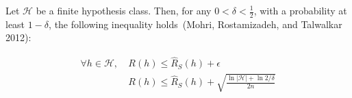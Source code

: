 \documentclass[
  letterpaper,
  12pt,
  british]{tufte-book}
\theoremstyle{plain}
\theoremstyle{definition}
\theoremstyle{plain}
\theoremstyle{remark}
\begin{document}
\protect\hypertarget{thrm:finite-inconsistent}{}{} Let \(\mathcal{H}\)
be a finite hypothesis class. Then, for any
\(0 < \delta < \tfrac{1}{2}\), with a probability at least \(1-\delta\),
the following inequality holds~(Mohri, Rostamizadeh, and Talwalkar
2012):

\begin{align}
        \forall h \in \mathcal{H},~&R(h)\leq \hat{R}_{S}(h) + \epsilon \nonumber \\
        &R(h)\leq \hat{R}_{S}(h) + \sqrt{\frac{\ln{|\mathcal{H}|}+ \ln{2/\delta}}{2n}}
    
\end{align}
\end{document}
